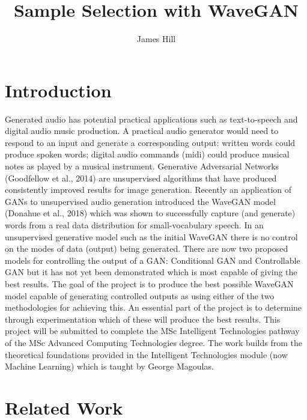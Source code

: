 \documentclass[titlepage]{article}
\title{Sample Selection with WaveGAN}
\author{James Hill}
\date{}
\begin{document}
\maketitle

\section{Introduction}

Generated audio has potential practical applications such as text-to-speech and digital audio music production.
A practical audio generator would need to respond to an input and generate a corresponding output: written words could produce spoken words; digital audio commands (midi) could produce musical notes as played by a musical instrument.
\newline
\newline
Generative Adversarial Networks (Goodfellow et al., 2014) are unsupervised algorithms that have produced consistently improved results for image generation.
Recently an application of GANs to unsupervised audio generation introduced the WaveGAN model (Donahue et al., 2018) which was shown to successfully capture (and generate) words from a real data distribution for small-vocabulary speech.
\newline
\newline
In an unsupervised generative model such as the initial WaveGAN there is no control on the modes of data (output) being generated.
There are now two proposed models for controlling the output of a GAN: Conditional GAN and Controllable GAN but it has not yet been demonstrated which is most capable of giving the best results.
\newline
\newline
The goal of the project is to produce the best possible WaveGAN model capable of generating controlled outputs as using either of the two methodologies for achieving this.
An essential part of the project is to determine through experimentation which of these will produce the best results.
\newline
\newline
This project will be submitted to complete the MSc Intelligent Technologies pathway of the MSc Advanced Computing Technologies degree.
The work builds from the theoretical foundations provided in the Intelligent Technologies module (now Machine Learning) which is taught by George Magoulas.

\section{Related Work}
\end{document}
